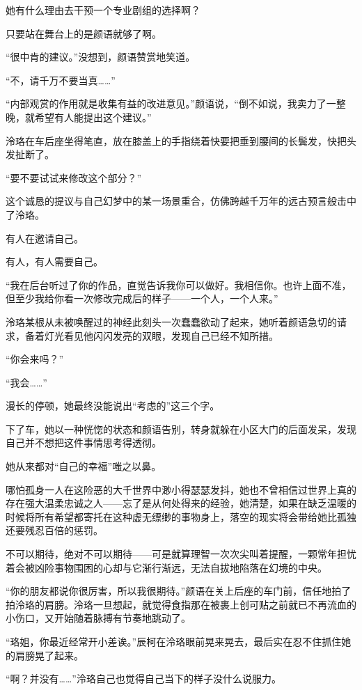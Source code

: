 \documentclass[UTF8, scheme = chinese, openany]{ctexbook}
\begin{document}
她有什么理由去干预一个专业剧组的选择啊？

只要站在舞台上的是颜语就够了啊。

“很中肯的建议。”没想到，颜语赞赏地笑道。

“不，请千万不要当真……”

“内部观赏的作用就是收集有益的改进意见。”颜语说，“倒不如说，我卖力了一整晚，就希望有人能提出这个建议。”

泠珞在车后座坐得笔直，放在膝盖上的手指绕着快要把垂到腰间的长鬓发，快把头发扯断了。

“要不要试试来修改这个部分？”

这个诚恳的提议与自己幻梦中的某一场景重合，仿佛跨越千万年的远古预言般击中了泠珞。

有人在邀请自己。

有人，有人需要自己。

“我在后台听过了你的作品，直觉告诉我你可以做好。我相信你。也许上面不准，但至少我给你看一次修改完成后的样子——一个人，一个人来。”

泠珞某根从未被唤醒过的神经此刻头一次蠢蠢欲动了起来，她听着颜语急切的请求，备着灯光看见他闪闪发亮的双眼，发现自己已经不知所措。

“你会来吗？”

“我会……”

漫长的停顿，她最终没能说出“考虑的”这三个字。

下了车，她以一种恍惚的状态和颜语告别，转身就躲在小区大门的后面发呆，发现自己并不想把这件事情思考得透彻。

她从来都对“自己的幸福”嗤之以鼻。

哪怕孤身一人在这险恶的大千世界中渺小得瑟瑟发抖，她也不曾相信过世界上真的存在强大温柔忠诚之人——忘了是从何处得来的经验，她清楚，如果在缺乏温暖的时候将所有希望都寄托在这种虚无缥缈的事物身上，落空的现实将会带给她比孤独还要残忍百倍的惩罚。

不可以期待，绝对不可以期待——可是就算理智一次次尖叫着提醒，一颗常年担忧着会被凶险事物围困的心却与它渐行渐远，无法自拔地陷落在幻境的中央。

“你的朋友都说你很厉害，所以我很期待。”颜语在关上后座的车门前，信任地拍了拍泠珞的肩膀。泠珞一旦想起，就觉得食指那在被裹上创可贴之前就已不再流血的小伤口，又开始随着脉搏有节奏地跳动了。

\vspace{1.5em}

“珞姐，你最近经常开小差诶。”辰柯在泠珞眼前晃来晃去，最后实在忍不住抓住她的肩膀晃了起来。

“啊？并没有……”泠珞自己也觉得自己当下的样子没什么说服力。
\end{document}
